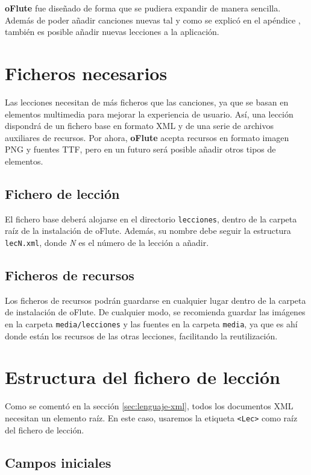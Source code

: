 \textbf{oFlute} fue diseñado de forma que se pudiera expandir de manera
sencilla. Además de poder añadir canciones nuevas tal y como se explicó en el
apéndice \textit{}, también es posible añadir
nuevas lecciones a la aplicación.

\section{Ficheros necesarios}

Las lecciones necesitan de más ficheros que las canciones, ya que se basan en
elementos multimedia para mejorar la experiencia de usuario. Así, una lección
dispondrá de un fichero base en formato XML y de una serie de archivos
auxiliares de recursos. Por ahora, \textbf{oFlute} acepta recursos en formato
imagen PNG  y fuentes TTF, pero en un futuro será posible
añadir otros tipos de elementos.

\subsection{Fichero de lección}
El fichero base deberá alojarse en el directorio \texttt{lecciones}, dentro de
la carpeta raíz de la instalación de oFlute. Además, su nombre debe seguir la
estructura \texttt{lecN.xml}, donde \textit{N} es el número de la lección a
añadir.

\subsection{Ficheros de recursos}
Los ficheros de recursos podrán guardarse en cualquier lugar dentro de la
carpeta de instalación de oFlute. De cualquier modo, se recomienda guardar las
imágenes en la carpeta \texttt{media/lecciones} y las fuentes en la carpeta
\texttt{media}, ya que es ahí donde están los recursos de las otras lecciones,
facilitando la reutilización.

\section{Estructura del fichero de lección}

Como se comentó en la sección \ref{sec:lenguaje-xml}, todos los documentos XML
necesitan un elemento raíz. En este caso, usaremos la etiqueta \texttt{<Lec>}
como raíz del fichero de lección.


\subsection{Campos iniciales}

